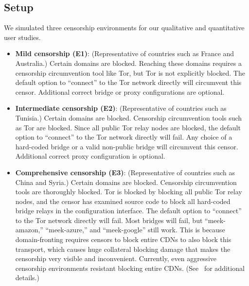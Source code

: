 \documentclass[USenglish,oneside,twocolumn]{article}
\begin{document}
\subsection{Setup}
\label{sec:setup}
We simulated three censorship environments for our qualitative and quantitative user studies. \\

\begin{itemize} \itemsep1pt \parskip0pt 
\item {\bfseries Mild censorship (E1)}: 
(Representative of countries such as France and Australia.)
Certain domains are blocked. Reaching these 
domains requires a censorship circumvention 
tool like Tor, but Tor is not explicitly blocked. 
The default option to ``connect'' to the Tor network 
directly will circumvent this censor. Additional correct
bridge or proxy configurations are optional. 

\item {\bfseries Intermediate censorship (E2)}: 
(Representative of countries such as Tunisia.)
Certain domains are blocked. Censorship circumvention
tools such as Tor are blocked. Since all public Tor
relay nodes are blocked, the default option to ``connect'' to the Tor network
directly will fail. Any choice of a hard-coded bridge
or a valid non-public bridge will circumvent this censor.  
Additional correct proxy configuration is optional.

\item {\bfseries Comprehensive censorship (E3)}:
(Representative of countries such as China and Syria.)
Certain domains are blocked. Censorship circumvention tools
are thoroughly blocked. Tor is blocked by blocking all public
Tor relay nodes, and the censor has examined source code to block
all hard-coded bridge relays in the configuration interface. The default option
to ``connect'' to the Tor network directly will fail. Most bridges will fail,
but ``meek-amazon,'' ``meek-azure,'' and ``meek-google'' still work.
This is because domain-fronting requires censors to block entire CDNs to also
block this transport, which causes huge collateral blocking damage that
makes the censorship very visible and inconvenient. Currently, even
aggressive censorship environments resistant blocking entire CDNs.
(See~\cite{fifield2015blocking} for additional details.)
\end{itemize}
\end{document}
